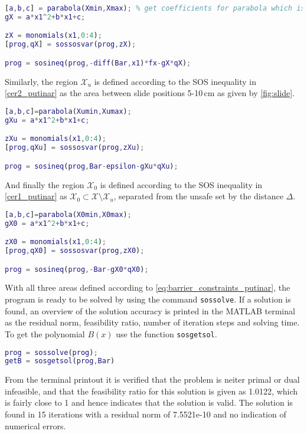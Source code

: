 \begin{lstlisting}[language=matlab]
% Define space X in Rn
[a,b,c] = parabola(Xmin,Xmax); % get coefficients for parabola which is positive for x in [-0.1,0.1] m
gX = a*x1^2+b*x1+c;

zX = monomials(x1,0:4);
[prog,qX] = sossosvar(prog,zX);

prog = sosineq(prog,-diff(Bar,x1)*fx-gX*qX);
\end{lstlisting}
Similarly, the region $\mathcal{X}_u$ is defined according to the SOS inequality in \autoref{cer2_putinar} as the area between slide positions 5-10\,cm as given by \autoref{fig:slide}.
\begin{lstlisting}[language=matlab]
% Define space Xu in X
[a,b,c]=parabola(Xumin,Xumax);
gXu = a*x1^2+b*x1+c;

zXu = monomials(x1,0:4);
[prog,qXu] = sossosvar(prog,zXu);

prog = sosineq(prog,Bar-epsilon-gXu*qXu);
\end{lstlisting}
And finally the region $\mathcal{X}_0$ is defined according to the SOS inequality in \autoref{cer1_putinar} as $\mathcal{X}_0\subset\mathcal{X}\setminus\mathcal{X}_u$, separated from the unsafe set by the distance $\Delta$.
\begin{lstlisting}[language=matlab]
% Define space X0 in X
[a,b,c]=parabola(X0min,X0max);
gX0 = a*x1^2+b*x1+c;

zX0 = monomials(x1,0:4);
[prog,qX0] = sossosvar(prog,zX0);

prog = sosineq(prog,-Bar-gX0*qX0);
\end{lstlisting}
With all three areas defined according to \autoref{eq:barrier_constraints_putinar}, the program is ready to be solved by using the command \texttt{sossolve}. If a solution is found, an overview of the solution accuracy is printed in the MATLAB terminal as the residual norm, feasibility ratio, number of iteration steps and solving time. To get the polynomial $B(x)$ use the function \texttt{sosgetsol}.
\begin{lstlisting}[language=matlab]
% Solve for barrier certificate
prog = sossolve(prog);
getB = sosgetsol(prog,Bar)
\end{lstlisting}

\vspace{-2mm}
From the terminal printout it is verified that the problem is neiter primal or dual infeasible, and that the feasibility ratio for this solution is given as 1.0122, which is fairly close to 1 and hence indicates that the solution is valid. The solution is found in 15 iterations with a residual norm of 7.5521e-10 and no indication of numerical errors.

